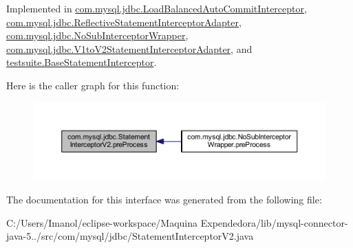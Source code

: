 Implemented in \mbox{\hyperlink{classcom_1_1mysql_1_1jdbc_1_1_load_balanced_auto_commit_interceptor_a6a69c6841856a5f6f8062206f2854d76}{com.\+mysql.\+jdbc.\+Load\+Balanced\+Auto\+Commit\+Interceptor}}, \mbox{\hyperlink{classcom_1_1mysql_1_1jdbc_1_1_reflective_statement_interceptor_adapter_afd1203522724452385bc67c8949586b3}{com.\+mysql.\+jdbc.\+Reflective\+Statement\+Interceptor\+Adapter}}, \mbox{\hyperlink{classcom_1_1mysql_1_1jdbc_1_1_no_sub_interceptor_wrapper_a60bc39ee3aaef8a088cecda8f0f5a831}{com.\+mysql.\+jdbc.\+No\+Sub\+Interceptor\+Wrapper}}, \mbox{\hyperlink{classcom_1_1mysql_1_1jdbc_1_1_v1to_v2_statement_interceptor_adapter_a51a9e9ad7779917b8755806589849559}{com.\+mysql.\+jdbc.\+V1to\+V2\+Statement\+Interceptor\+Adapter}}, and \mbox{\hyperlink{classtestsuite_1_1_base_statement_interceptor_aa08942c2eb76d1550322df94b28bb2cc}{testsuite.\+Base\+Statement\+Interceptor}}.

Here is the caller graph for this function\+:
\nopagebreak
\begin{figure}[H]
\begin{center}
\leavevmode
\includegraphics[width=350pt]{interfacecom_1_1mysql_1_1jdbc_1_1_statement_interceptor_v2_abe4a0e52fc3e4cc9b458dd8eaeef82ff_icgraph}
\end{center}
\end{figure}


The documentation for this interface was generated from the following file\+:\begin{DoxyCompactItemize}
\item 
C\+:/\+Users/\+Imanol/eclipse-\/workspace/\+Maquina Expendedora/lib/mysql-\/connector-\/java-\/5../src/com/mysql/jdbc/Statement\+Interceptor\+V2.\+java\end{DoxyCompactItemize}
